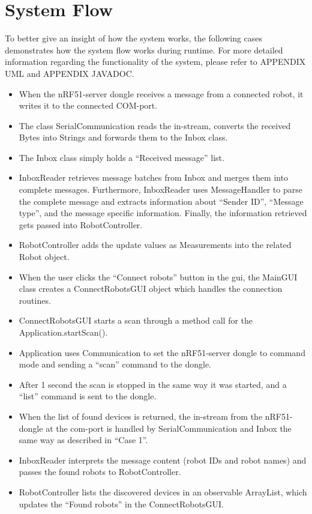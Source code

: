 \section{System Flow}
To better give an insight of how the system works, the following cases demonstrates how the system flow works during runtime. For more detailed information regarding the functionality of the system, please refer to APPENDIX UML and APPENDIX JAVADOC.

\begin{itemize}
    \item When the nRF51-server dongle receives a message from a connected robot, it writes it to the connected COM-port.
    \item The class SerialCommunication reads the in-stream, converts the received Bytes into Strings and forwards them to the Inbox class.
    \item The Inbox class simply holds a ``Received message'' list.
    \item InboxReader retrieves message batches from Inbox and merges them into complete messages. Furthermore, InboxReader uses MessageHandler to parse the complete message and extracts information about ``Sender ID'', ``Message type'', and the message specific information. Finally, the information retrieved gets passed into RobotController.
    \item RobotController adds the update values as Measurements into the related Robot object.
\end{itemize}

\begin{itemize}
    \item When the user clicks the ``Connect robots'' button in the \acrshort{gui}, the MainGUI class creates a ConnectRobotsGUI object which handles the connection routines.
    \item ConnectRobotsGUI starts a scan through a method call for the Application.startScan().
    \item Application uses Communication to set the nRF51-server dongle to command mode and sending a ``scan'' command to the dongle.
    \item After 1 second the scan is stopped in the same way it was started, and a ``list'' command is sent to the dongle.
    \item When the list of found devices is returned, the in-stream from the nRF51-dongle at the \acrshort{com}-port is handled by SerialCommunication and Inbox the same way as described in ``Case 1''.
    \item InboxReader interprets the message content (robot IDs and robot names) and passes the found robots to RobotController.
    \item RobotController lists the discovered devices in an observable ArrayList, which updates the ``Found robots'' in the ConnectRobotsGUI.
\end{itemize}